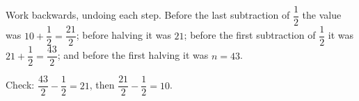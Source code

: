 Work backwards, undoing each step. Before the last subtraction of $\dfrac{1}{2}$ the value was $10+\dfrac{1}{2}=\dfrac{21}{2}$; before halving it was $21$; before the first subtraction of $\dfrac{1}{2}$ it was $21+\dfrac{1}{2}=\dfrac{43}{2}$; and before the first halving it was $n=\boxed{43}$.

Check: $\dfrac{43}{2}-\dfrac{1}{2}=21$, then $\dfrac{21}{2}-\dfrac{1}{2}=10$.
